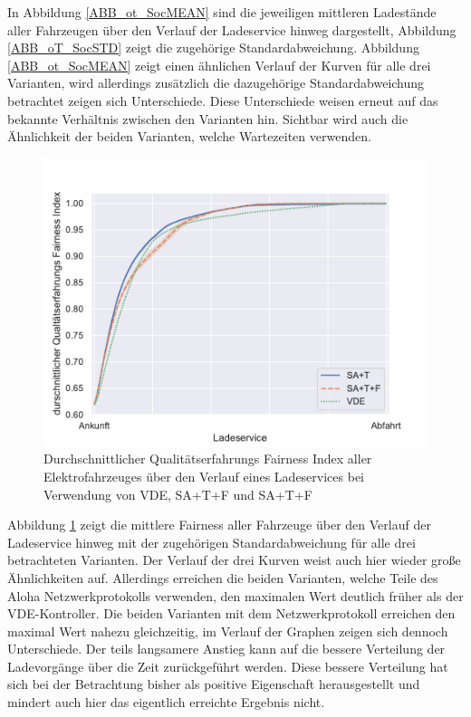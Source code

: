 In Abbildung \ref{ABB_ot_SocMEAN} sind die jeweiligen mittleren Ladestände aller Fahrzeugen über den Verlauf der Ladeservice hinweg dargestellt, Abbildung \ref{ABB_oT_SocSTD} zeigt die zugehörige Standardabweichung. Abbildung \ref{ABB_ot_SocMEAN} zeigt einen ähnlichen Verlauf der Kurven für alle drei Varianten, wird allerdings zusätzlich die dazugehörige Standardabweichung betrachtet zeigen sich Unterschiede. Diese Unterschiede weisen erneut auf das bekannte Verhältnis zwischen den Varianten hin. Sichtbar wird auch die Ähnlichkeit der beiden Varianten, welche Wartezeiten verwenden.
\begin{figure}[htb]
\centering
	\includegraphics[scale=0.45]{img/ohneTrafo/SlottedAloha_participants_VDE_tau_13_qoe.pdf}
	\caption{Durchschnittlicher Qualitätserfahrungs Fairness Index aller Elektrofahrzeuges über den Verlauf eines Ladeservices bei Verwendung von VDE, SA+T+F und SA+T+F}
	\label{Abb_oT_Fairness}
\end{figure}
Abbildung \ref{Abb_oT_Fairness} zeigt die mittlere Fairness aller Fahrzeuge über den Verlauf der Ladeservice hinweg mit der zugehörigen Standardabweichung für alle drei betrachteten Varianten. Der Verlauf der drei Kurven weist auch hier wieder große Ähnlichkeiten auf. Allerdings erreichen die beiden Varianten, welche Teile des Aloha Netzwerkprotokolls verwenden, den maximalen Wert deutlich früher als der VDE-Kontroller. Die beiden Varianten mit dem Netzwerkprotokoll erreichen den maximal Wert nahezu gleichzeitig, im Verlauf der Graphen zeigen sich dennoch Unterschiede. Der teils langsamere Anstieg kann auf die bessere Verteilung der Ladevorgänge über die Zeit zurückgeführt werden. Diese bessere Verteilung hat sich bei der Betrachtung bisher als positive Eigenschaft herausgestellt und mindert auch hier das eigentlich erreichte Ergebnis nicht.
